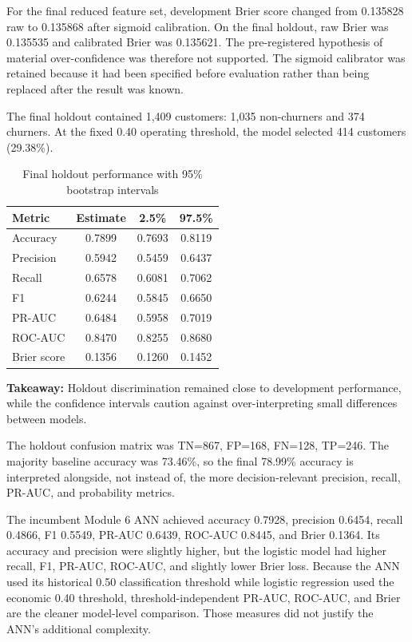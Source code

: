 \documentclass[11pt]{article}
\newcommand{\takeaway}[1]{\vspace{1pt}\noindent\textbf{Takeaway:} #1\vspace{3pt}}
\begin{document}
For the final reduced feature set, development Brier score changed from 0.135828 raw to 0.135868 after sigmoid calibration. On the final holdout, raw Brier was 0.135535 and calibrated Brier was 0.135621. The pre-registered hypothesis of material over-confidence was therefore not supported. The sigmoid calibrator was retained because it had been specified before evaluation rather than being replaced after the result was known.

The final holdout contained 1,409 customers: 1,035 non-churners and 374 churners. At the fixed 0.40 operating threshold, the model selected 414 customers (29.38\%).

\begin{table}[H]
\centering\small
\caption{Final holdout performance with 95\% bootstrap intervals}
\begin{tabular}{lccc}
\toprule
Metric & Estimate & 2.5\% & 97.5\% \\
\midrule
Accuracy & 0.7899 & 0.7693 & 0.8119 \\
Precision & 0.5942 & 0.5459 & 0.6437 \\
Recall & 0.6578 & 0.6081 & 0.7062 \\
F1 & 0.6244 & 0.5845 & 0.6650 \\
PR-AUC & 0.6484 & 0.5958 & 0.7019 \\
ROC-AUC & 0.8470 & 0.8255 & 0.8680 \\
Brier score & 0.1356 & 0.1260 & 0.1452 \\
\bottomrule
\end{tabular}
\end{table}
\takeaway{Holdout discrimination remained close to development performance, while the confidence intervals caution against over-interpreting small differences between models.}

The holdout confusion matrix was TN=867, FP=168, FN=128, TP=246. The majority baseline accuracy was 73.46\%, so the final 78.99\% accuracy is interpreted alongside, not instead of, the more decision-relevant precision, recall, PR-AUC, and probability metrics.

The incumbent Module 6 ANN achieved accuracy 0.7928, precision 0.6454, recall 0.4866, F1 0.5549, PR-AUC 0.6439, ROC-AUC 0.8445, and Brier 0.1364. Its accuracy and precision were slightly higher, but the logistic model had higher recall, F1, PR-AUC, ROC-AUC, and slightly lower Brier loss. Because the ANN used its historical 0.50 classification threshold while logistic regression used the economic 0.40 threshold, threshold-independent PR-AUC, ROC-AUC, and Brier are the cleaner model-level comparison. Those measures did not justify the ANN's additional complexity.
\end{document}
